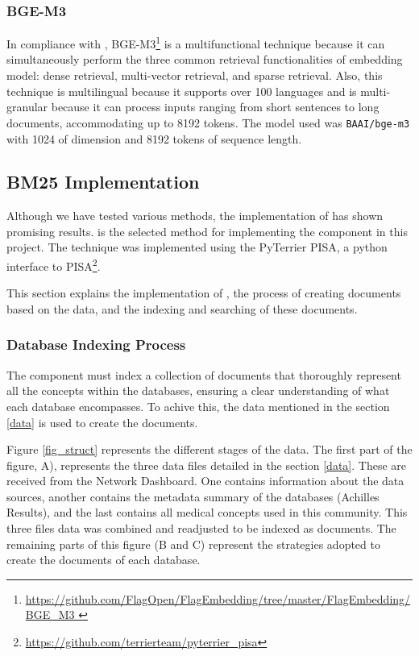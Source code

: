 

\subsubsection{BGE-M3} 

In compliance with \citet{chen_bge_2024}, BGE-M3\footnote{\url{https://github.com/FlagOpen/FlagEmbedding/tree/master/FlagEmbedding/BGE_M3 }} is a multifunctional technique because it can simultaneously perform  the three common retrieval functionalities of embedding model: dense retrieval, multi-vector retrieval, and sparse retrieval. Also, this technique is multilingual because it supports over 100 languages and is multi-granular because it can process inputs ranging from short sentences to long documents, accommodating up to 8192 tokens. The model used was \texttt{BAAI/bge-m3} with 1024 of dimension and 8192 tokens of sequence length.




\subsection{BM25 Implementation}
\label{bm25implementation}

Although we have tested various methods, the implementation of {\bm} has shown promising results. {\bm} is the selected method for implementing the {\ir} component in this project. The technique was implemented using the PyTerrier PISA, a python interface to PISA\footnote{\url{https://github.com/terrierteam/pyterrier_pisa}}.

This section explains the implementation of {\bm}, the process of creating documents based on the {\ehden} data, and the indexing and searching of these documents.


\subsubsection{Database Indexing Process}

The {\ir} component must index a collection of documents that thoroughly represent all the concepts within the databases, ensuring a clear understanding of what each database encompasses. To achive this, the data mentioned in the section \ref{data} is used to create the documents.

Figure \ref{fig_struct} represents the different stages of the data. The first part of the figure, A), represents the three data files detailed in the section \ref{data}. These are received from the {\ehden} Network Dashboard. One contains information about the data sources, another contains the metadata summary of the databases (Achilles Results), and the last contains all medical concepts used in this community. This three files data was combined and readjusted to be indexed as documents. The remaining parts of this figure (B and C) represent the strategies adopted to create the documents of each database.

